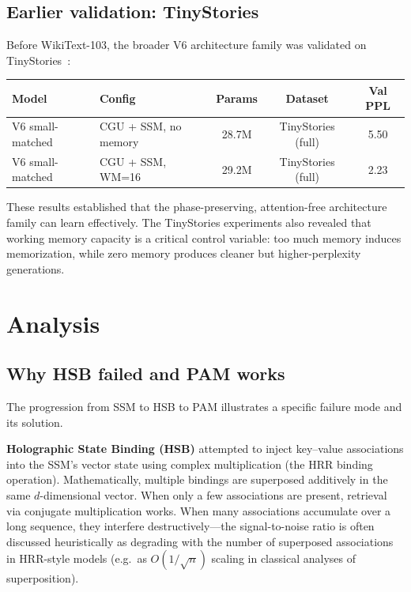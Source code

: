 \documentclass[11pt]{article}
\begin{document}
\subsection{Earlier validation: TinyStories}
Before WikiText-103, the broader V6 architecture family was validated on TinyStories~\cite{eldan2023tinystories}:
\begin{table}[h]
  \centering
  \begin{tabular}{@{}llccc@{}}
    \toprule
    Model & Config & Params & Dataset & Val PPL \\
    \midrule
    V6 small-matched & CGU + SSM, no memory & 28.7M & TinyStories (full) & 5.50 \\
    V6 small-matched & CGU + SSM, WM=16 & 29.2M & TinyStories (full) & 2.23 \\
    \bottomrule
  \end{tabular}
\end{table}

These results established that the phase-preserving, attention-free architecture family can learn effectively. The TinyStories experiments also revealed that working memory capacity is a critical control variable: too much memory induces memorization, while zero memory produces cleaner but higher-perplexity generations.

\section{Analysis}
\label{sec:analysis}

\subsection{Why HSB failed and PAM works}
\label{sec:hsb}
The progression from SSM to HSB to PAM illustrates a specific failure mode and its solution.

\textbf{Holographic State Binding (HSB)} attempted to inject key--value associations into the SSM's vector state using complex multiplication (the HRR binding operation). Mathematically, multiple bindings are superposed additively in the same $d$-dimensional vector. When only a few associations are present, retrieval via conjugate multiplication works. When many associations accumulate over a long sequence, they interfere destructively---the signal-to-noise ratio is often discussed heuristically as degrading with the number of superposed associations in HRR-style models (e.g.\ as $O(1/\sqrt{n})$ scaling in classical analyses of superposition).
\end{document}
